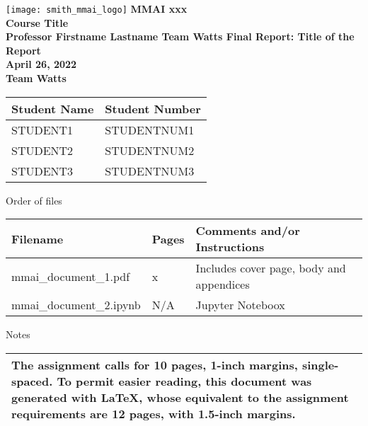 \begin{titlepage}
  \raggedleft
  \texttt{[image: smith\_mmai\_logo]}
  \centering
  \vfill
  {\bfseries\large
    MMAI xxx \\
    Course Title \\
    \vskip0.5cm
    Professor Firstname Lastname
    \vskip1cm
    Team Watts Final Report: Title of the Report\\
    April 26, 2022\\
  }
  \vskip0.5cm
  \textbf{Team Watts} \\
  \vskip0.2cm
  \begin{tabular}{|l|l|}
	\hline
	Student Name & Student Number \\
	\hline
	STUDENT1 & STUDENTNUM1 \\
	STUDENT2 & STUDENTNUM2 \\
	STUDENT3 & STUDENTNUM3 \\
	\hline
  \end{tabular}
  \vskip0.4cm
  Order of files
  \vskip0.2cm
  {\renewcommand{\arraystretch}{1.5}
  \begin{tabular}{|p{2.5in}|p{.5in}|p{2.5in}|}
	\hline
	Filename & Pages & Comments and/or Instructions \\
	\hline
	mmai\_document\_1.pdf & x & Includes cover page, body and appendices \\
	mmai\_document\_2.ipynb & N/A & Jupyter Noteboox \\
	\hline
  \end{tabular}}
  \vskip0.4cm
  Notes\\
  \vskip0.2cm
  {\renewcommand{\arraystretch}{1.5}
  \begin{tabular}{|p{5.5in}|}
	\hline
	The assignment calls for 10 pages, 1-inch margins, single-spaced. To permit easier
	reading, this document was generated with \LaTeX, whose equivalent to the
	assignment requirements are 12 pages, with 1.5-inch margins. \\
	\hline
  \end{tabular}}
  \vfill
\end{titlepage}
